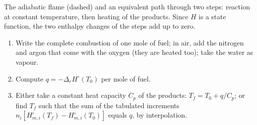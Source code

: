 \begin{omfigure}

{\small The adiabatic flame (dashed) and an equivalent path through two
steps: reaction at constant temperature, then heating of the products.
Since $H$ is a state function, the two enthalpy changes of the steps add
up to zero.}
\end{omfigure}

\begin{method}\label{met:b2:reaction-enthalpy:flame-temperature}
\begin{enumerate}
  \item Write the complete combustion of one mole of fuel; in air, add
        the nitrogen and argon that come with the oxygen (they are heated
        too); take the water as vapour.
  \item Compute $q = -\Delta_r H^\circ(T_0)$ per mole of fuel.
  \item Either take a constant heat capacity $C_p$ of the products:
        $T_f = T_0 + q/C_p$; or find $T_f$ such that the sum of the
        tabulated increments $n_i[H^\circ_{m,i}(T_f) - H^\circ_{m,i}(T_0)]$
        equals $q$, by interpolation.
\end{enumerate}
\end{method}

